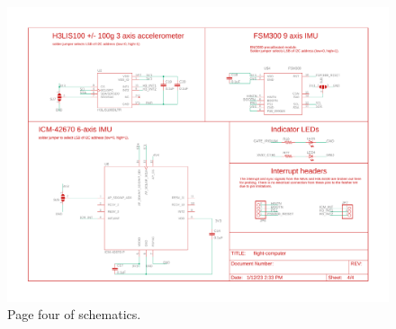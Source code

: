 \documentclass{article}
\begin{document}
\begin{figure}[H]
    \centering
    \includegraphics[width=\textwidth]{images/flight-computer-schematic-page4.pdf}
    \caption{Page four of schematics.}
    \label{fig:page1-4}
\end{figure}


\end{document}
